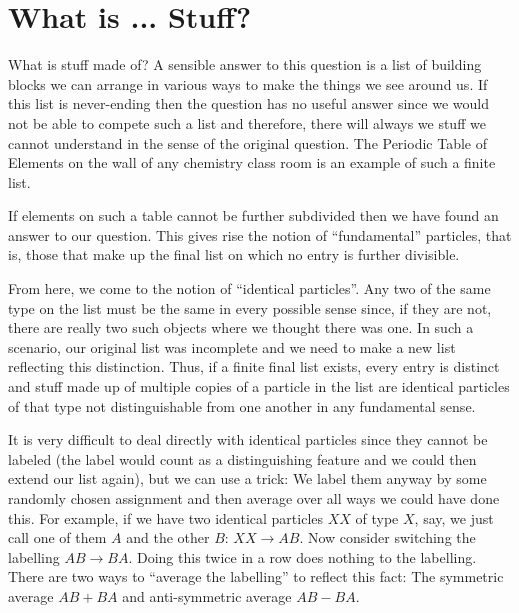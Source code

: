 \documentclass[12pt, fleqn]{article}
\begin{document}
\pagestyle{empty}

\section*{What is ... Stuff?}

What is stuff made of?
A sensible answer to this question is a list of building blocks we can arrange in various ways to make the things we see around us. 
If this list is 
never-ending
then the question has no useful answer since we would not be able to compete such a list and therefore, there will always we stuff we cannot understand in the sense of the original question.
The Periodic Table of Elements on the wall of any chemistry class room is an example of such a finite list.

If elements on such a table cannot be further subdivided then we have found an answer to our question. 
This gives rise the notion of ``fundamental'' particles, that is, those that make up the final list on which no entry is further divisible. 

From here, we come to the notion of ``identical particles''. 
Any two of the same type on the list must be the same in every possible sense since, if they are not, there are really two such objects where we thought there was one.
In such a scenario, our original list was incomplete and we need to make a new list reflecting this distinction. 
Thus, if a finite final list exists, every entry is distinct and stuff made up of multiple copies of a particle in the list are identical particles of that type not distinguishable from one another in any fundamental sense. 

It is very difficult to deal directly with identical particles since they cannot be labeled (the label would count as a distinguishing feature and we could then extend our list again), but we can use a trick: We label them anyway by some randomly chosen assignment and then average over all ways we could have done this. 
For example, if we have two identical particles $XX$ of type $X$, say, we just call one of them $A$ and the other $B$: $XX \to AB$. Now consider switching the labelling $AB \to BA$. 
Doing this twice in a row does nothing to the labelling. 
There are two ways to ``average the labelling'' to reflect this fact: The symmetric average $AB+BA$ and anti-symmetric average $AB-BA$. 

\end{document}
